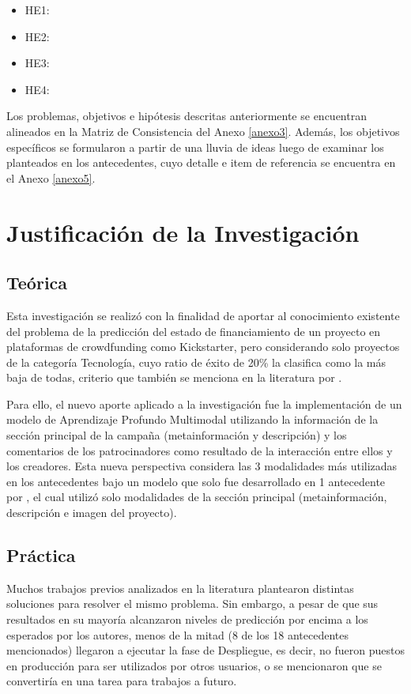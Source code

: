 \begin{itemize}
	\item HE1: \Hone
	\item HE2: \Htwo
	\item HE3: \Hthree
	\item HE4: \Hfour
\end{itemize}

Los problemas, objetivos e hipótesis descritas anteriormente se encuentran alineados en la Matriz de Consistencia del Anexo \ref{anexo3}. Además, los objetivos específicos se formularon a partir de una lluvia de ideas luego de examinar los planteados en los antecedentes, cuyo detalle e item de referencia se encuentra en el Anexo \ref{anexo5}.

\section{Justificación de la Investigación}

\subsection{Teórica}
Esta investigación se realizó con la finalidad de aportar al conocimiento existente del problema de la predicción del estado de financiamiento de un proyecto en plataformas de crowdfunding como Kickstarter, pero considerando solo proyectos de la categoría Tecnología, cuyo ratio de éxito de 20\% la clasifica como la más baja de todas, criterio que también se menciona en la literatura por \cite{pr_lee2018contentDL}.

Para ello, el nuevo aporte aplicado a la investigación fue la implementación de un modelo de Aprendizaje Profundo Multimodal utilizando la información de la sección principal de la campaña (metainformación y descripción) y los comentarios de los patrocinadores como resultado de la interacción entre ellos y los creadores. Esta nueva perspectiva considera las 3 modalidades más utilizadas en los antecedentes bajo un modelo que solo fue desarrollado en 1 antecedente por \cite{pr_cheng2019deeplearning}, el cual utilizó solo modalidades de la sección principal (metainformación, descripción e imagen del proyecto).

\subsection{Práctica}
Muchos trabajos previos analizados en la literatura plantearon distintas soluciones para resolver el mismo problema. Sin embargo, a pesar de que sus resultados en su mayoría alcanzaron niveles de predicción por encima a los esperados por los autores, menos de la mitad (8 de los 18 antecedentes mencionados) llegaron a ejecutar la fase de Despliegue, es decir, no fueron puestos en producción para ser utilizados por otros usuarios, o se mencionaron que se convertiría en una tarea para trabajos a futuro.

